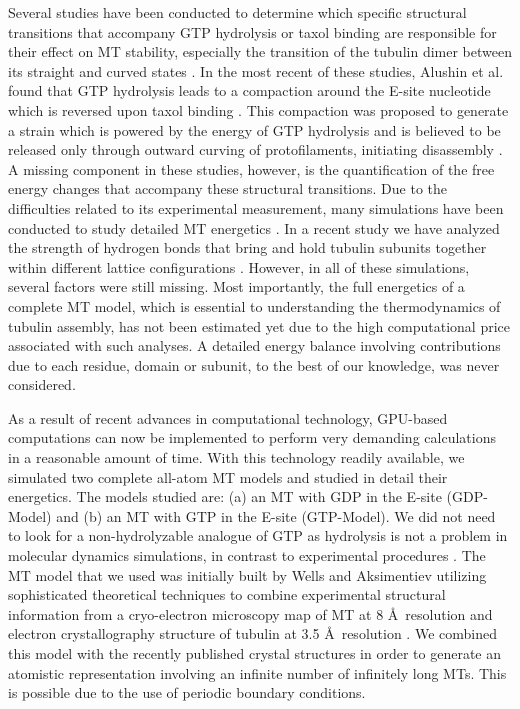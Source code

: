 \documentclass[11pt]{report}
\begin{document}
Several studies have been conducted to determine which specific structural
transitions that accompany GTP hydrolysis or taxol binding are
responsible for their effect on MT stability, especially the transition of the tubulin dimer between its straight and curved states \cite{Mandelkow1991,Hyman1995,Nogales2006,Barbier2010,Alushin2014}. In the
most recent of these studies, Alushin et al. found that GTP hydrolysis
leads to a compaction around the E-site nucleotide which is reversed
upon taxol binding \cite{Alushin2014}. This compaction was proposed to generate a strain 
which is powered by the energy of GTP hydrolysis and is believed to be released only through
outward curving of protofilaments, initiating disassembly \cite{Mitchison2014}. A missing component in these studies, however, 
is the quantification of the free energy changes that accompany these
structural transitions. Due to the difficulties related to its experimental measurement,
many simulations have been conducted to study detailed MT energetics
\cite{Erickson1981,VanBuren2002,Sept2003,Drabik2007,Andre2012,Kononova2014}. In a recent study 
we have analyzed the strength of hydrogen bonds that bring and hold tubulin
subunits together within different lattice configurations \cite{Ayoub2014}.
However, in all of these simulations, several factors were still missing. Most importantly, the full energetics of a complete MT model, 
which is essential to understanding the thermodynamics of tubulin assembly, has not been estimated yet due to the high computational price associated with such analyses. A detailed energy balance involving contributions due to each residue,
domain or subunit, to the best of our knowledge, was never
considered.

As a result of recent advances in computational technology, GPU-based computations can now be
implemented to perform very demanding calculations in a reasonable 
amount of time. With this technology readily available,
we simulated two complete all-atom MT models and studied in detail
their energetics. The models studied are: (a) an MT with GDP in the E-site (GDP-Model) and (b) an MT with GTP in the E-site (GTP-Model). We did not
need to look for a non-hydrolyzable analogue of GTP as hydrolysis is
not a problem in molecular dynamics simulations, in contrast to experimental
procedures \cite{Mitchison2014}.
The MT model that we used was initially built by Wells and 
Aksimentiev \cite{Wells2010} utilizing sophisticated theoretical techniques to combine experimental
structural information from a cryo-electron microscopy map of
MT at
8 \AA\ resolution \cite{Li2002} and electron crystallography structure of
tubulin at 3.5 \AA\ resolution \cite{Lowe2001}. We combined
this model with the recently published crystal
structures
\cite{Alushin2014} in order to generate an atomistic representation involving 
an infinite number of infinitely long MTs. This is possible due to the use of periodic boundary conditions.
\end{document}

